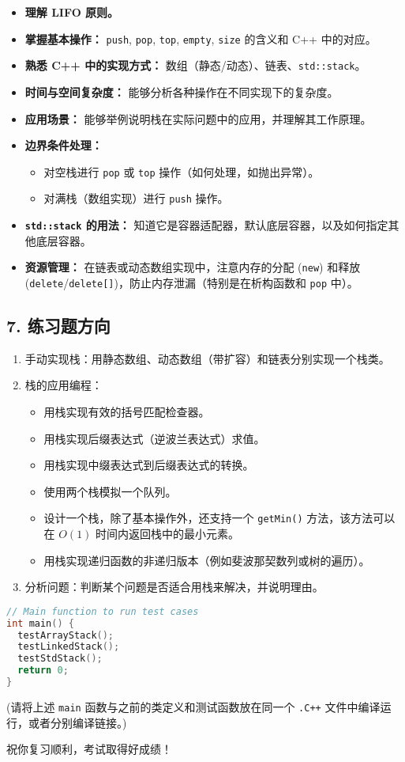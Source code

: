 \begin{itemize}
	\item \textbf{理解 LIFO 原则。}
	\item \textbf{掌握基本操作：} \lstinline{push}, \lstinline{pop}, \lstinline{top}, \lstinline{empty}, \lstinline{size} 的含义和 C++ 中的对应。
	\item \textbf{熟悉 C++ 中的实现方式：} 数组（静态/动态）、链表、\lstinline{std::stack}。
	\item \textbf{时间与空间复杂度：} 能够分析各种操作在不同实现下的复杂度。
	\item \textbf{应用场景：} 能够举例说明栈在实际问题中的应用，并理解其工作原理。
	\item \textbf{边界条件处理：}
	\begin{itemize}
		\item 对空栈进行 \lstinline{pop} 或 \lstinline{top} 操作（如何处理，如抛出异常）。
		\item 对满栈（数组实现）进行 \lstinline{push} 操作。
	\end{itemize}
	\item \textbf{\lstinline{std::stack} 的用法：} 知道它是容器适配器，默认底层容器，以及如何指定其他底层容器。
	\item \textbf{资源管理：} 在链表或动态数组实现中，注意内存的分配 (\lstinline{new}) 和释放 (\lstinline{delete}/\lstinline{delete[]})，防止内存泄漏（特别是在析构函数和 \lstinline{pop} 中）。
\end{itemize}

\subsection{7. 练习题方向}

\begin{enumerate}
	\item 手动实现栈：用静态数组、动态数组（带扩容）和链表分别实现一个栈类。
	\item 栈的应用编程：
	\begin{itemize}
		\item 用栈实现有效的括号匹配检查器。
		\item 用栈实现后缀表达式（逆波兰表达式）求值。
		\item 用栈实现中缀表达式到后缀表达式的转换。
		\item 使用两个栈模拟一个队列。
		\item 设计一个栈，除了基本操作外，还支持一个 \lstinline{getMin()} 方法，该方法可以在 $O(1)$ 时间内返回栈中的最小元素。
		\item 用栈实现递归函数的非递归版本（例如斐波那契数列或树的遍历）。
	\end{itemize}
	\item 分析问题：判断某个问题是否适合用栈来解决，并说明理由。
\end{enumerate}

\begin{lstlisting}[language=C++]
// Main function to run test cases
int main() {
  testArrayStack();
  testLinkedStack();
  testStdStack();
  return 0;
}
\end{lstlisting}
(请将上述 \lstinline{main} 函数与之前的类定义和测试函数放在同一个 \lstinline{.C++} 文件中编译运行，或者分别编译链接。)

祝你复习顺利，考试取得好成绩！
